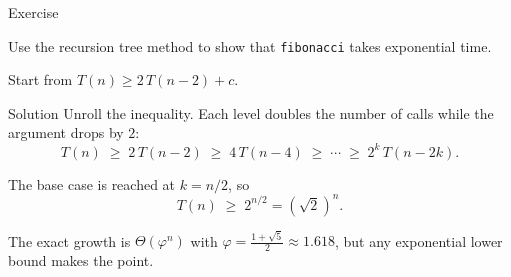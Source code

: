 \documentclass[10pt,aspectratio=169]{beamer}
\begin{document}
\begin{frame}{Exercise}
  \begin{center}
    Use the recursion tree method to show that \texttt{fibonacci} takes
    exponential time.
  \end{center}

  \bigskip
  \begin{center}
    \small Start from $T(n) \ge 2\,T(n-2) + c$.
  \end{center}
\end{frame}

\begin{frame}{Solution}
  Unroll the inequality. Each level \alert{doubles} the number of calls while
  the argument drops by $2$:
  \[
    T(n) \;\ge\; 2\,T(n-2) \;\ge\; 4\,T(n-4) \;\ge\; \cdots \;\ge\; 2^k\,T(n-2k).
  \]

  \bigskip
  The base case is reached at $k = n/2$, so
  \[
    T(n) \;\ge\; 2^{n/2} = \left(\sqrt{2}\right)^{n}.
  \]

  \bigskip
  \begin{center}
    \small The exact growth is $\Theta(\varphi^n)$ with
    $\varphi = \frac{1+\sqrt5}{2} \approx 1.618$, but any exponential lower
    bound makes the point.
  \end{center}
\end{frame}
\end{document}
